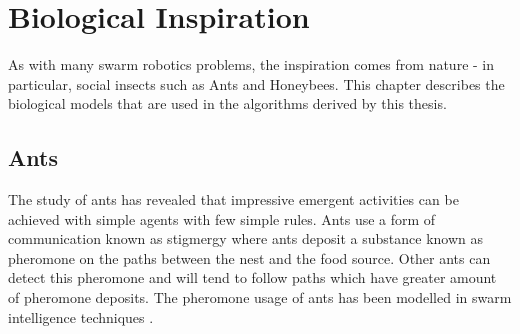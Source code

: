 


\section{Biological Inspiration}

As with many swarm robotics problems, the inspiration comes from nature - in particular, social insects such as Ants and Honeybees. This chapter describes the biological models that are used in the algorithms derived by this thesis. 

\label{sec:second:biological}

\subsection{Ants}
The study of ants has revealed that impressive emergent activities can be achieved with  simple agents with few simple rules. Ants use a form of communication known as stigmergy \cite{} where ants deposit a substance known as pheromone on the paths between the nest and the food source. Other ants can detect this pheromone and will tend to follow paths which have greater amount of pheromone deposits. The pheromone usage of ants has been modelled in swarm intelligence techniques \cite{dorigo2006ant, dorigo2010ant}. 

